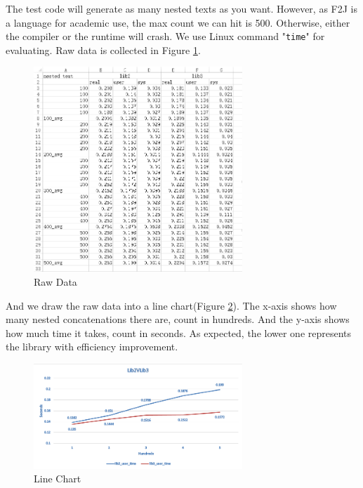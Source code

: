 The test code will generate as many nested texts as you want. However, as F2J is a language for academic use, the max count we can hit is 500. Otherwise, either the compiler or the runtime will crash. We use Linux command "\texttt{time}" for evaluating. Raw data is collected in Figure \ref{fig:efficiency comparation}.
\begin{figure}[h!]
    \centering
    \includegraphics[width = 0.7\textwidth]{imgs/raw_data}
    \caption{Raw Data}
    \label{fig:efficiency comparation}
\end{figure}
And we draw the raw data into a line chart(Figure \ref{fig:efficiency line chart}). The x-axis shows how many nested concatenations there are, count in hundreds. And the y-axis shows how much time it takes, count in seconds. As expected, the lower one represents the library with efficiency improvement.
\begin{figure}[h!]
    \centering
    \includegraphics[width = 0.7\textwidth]{imgs/compare}
    \caption{Line Chart}
    \label{fig:efficiency line chart}
\end{figure}

